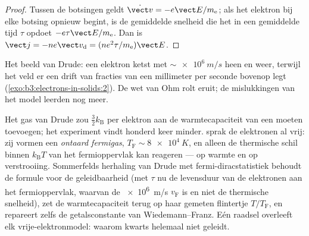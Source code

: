 \begin{proof}
Tussen de botsingen geldt $\dot{\vect v} = -e\vect E/m_{\text{e}}$;
als het elektron bij elke botsing opnieuw begint, is de gemiddelde snelheid die het in een
gemiddelde tijd $\tau$ opdoet $-e\tau\vect E/m_{\text{e}}$. Dan is $\vect j =
-ne\vect v_{\text{d}} = (ne^2\tau/m_{\text{e}})\vect E$.
\end{proof}

\begin{omfigure}

{\small Het beeld van Drude: een elektron ketst met
$\sim\qty{e6}{m/s}$ heen en weer, terwijl het veld er een drift van
fracties van een millimeter per seconde bovenop legt
(\cref{exo:b3:electrons-in-solids:2}). De wet van Ohm rolt eruit; de
mislukkingen van het model leerden nog meer.}
\end{omfigure}

\begin{remark}\label{rem:b3:electrons-in-solids:sommerfeld}
Het gas van Drude zou $\tfrac32k_{\text{B}}$ per elektron aan de
warmtecapaciteit van een  moeten toevoegen; het experiment vindt honderd keer minder.
 sprak de elektronen al vrij:
zij vormen een \emph{ontaard fermigas}, $T_{\text{F}} \sim
\qty{8e4}{K}$, en alleen de thermische schil binnen
$k_{\text{B}}T$ van het fermioppervlak kan reageren --- op warmte en
op verstrooiing. Sommerfelds herhaling van Drude met fermi-dirac\-statistiek
behoudt de formule voor de geleidbaarheid (met $\tau$ nu de
levensduur van de elektronen aan het fermioppervlak, waarvan de \qty{e6}{m/s}
$v_{\text{F}}$ is en niet de thermische snelheid), zet de warmtecapaciteit terug op haar
gemeten flintertje $T/T_{\text{F}}$, en repareert zelfs de
getalsconstante van Wiedemann--Franz. Eén raadsel overleeft elk
vrije-elektronmodel: waarom kwarts helemaal niet geleidt.
\end{remark}

